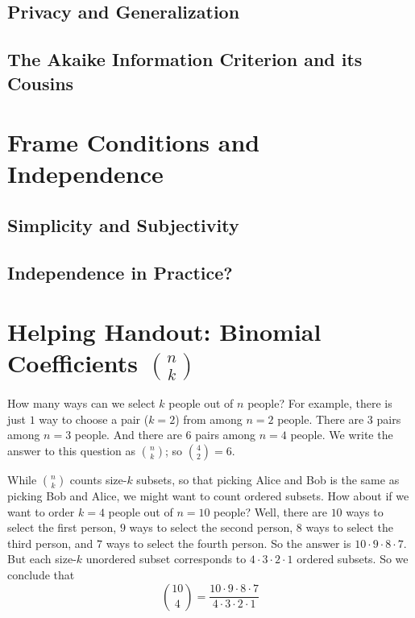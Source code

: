 \documentclass{article}
\begin{document}
        \subsection{Privacy and Generalization}
        \subsection{The Akaike Information Criterion and its Cousins}

    \section{Frame Conditions and Independence}
        \subsection{Simplicity and Subjectivity}
        \subsection{Independence in Practice?}

    \newpage
    \section*{Helping Handout: Binomial Coefficients ${n \choose k}$}
        How many ways can we select $k$ people out of $n$ people?
        For example,
        there is just $1$ way to choose a pair ($k=2$) from among $n=2$ people.
        There are $3$ pairs among $n=3$ people.
        And there are $6$ pairs among $n=4$ people.
        We write the answer to this question as ${n\choose k}$; so
        ${4\choose 2} = 6$. 
        
        While ${n\choose k}$ counts size-$k$ subsets, so that picking Alice 
        and Bob is the same as picking Bob and Alice, we might want to count
        ordered subsets.
        How about if we want to order $k=4$ people out of $n=10$ people?
        Well, there are $10$ ways to select the first person,
                         $9$ ways to select the second person,
                         $8$ ways to select the third person, and
                         $7$ ways to select the fourth person.
        So the answer is $10\cdot 9\cdot 8\cdot 7$.
        But each size-$k$ unordered subset corresponds to
        $4\cdot 3\cdot 2\cdot 1$ ordered subsets.  So we conclude that
        $$
            {10\choose 4} = \frac{10\cdot 9\cdot 8\cdot 7}{4\cdot 3\cdot 2\cdot 1} 
        $$
\end{document}
